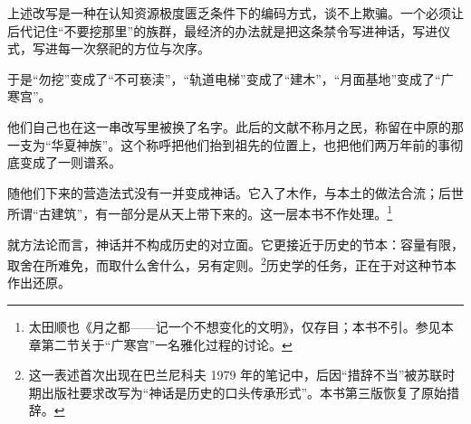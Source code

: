 上述改写是一种在认知资源极度匮乏条件下的编码方式，谈不上欺骗。一个必须让后代记住“不要挖那里”的族群，最经济的办法就是把这条禁令写进神话，写进仪式，写进每一次祭祀的方位与次序。

于是“勿挖”变成了“不可亵渎”，“轨道电梯”变成了“建木”，“月面基地”变成了“广寒宫”。

他们自己也在这一串改写里被换了名字。此后的文献不称月之民，称留在中原的那一支为“华夏神族”。这个称呼把他们抬到祖先的位置上，也把他们两万年前的事彻底变成了一则谱系。

随他们下来的营造法式没有一并变成神话。它入了木作，与本土的做法合流；后世所谓“古建筑”，有一部分是从天上带下来的。这一层本书不作处理。\footnote{太田顺也《月之都——记一个不想变化的文明》，仅存目；本书不引。参见本章第二节关于“广寒宫”一名雅化过程的讨论。}

就方法论而言，神话并不构成历史的对立面。它更接近于历史的节本：容量有限，取舍在所难免，而取什么舍什么，另有定则。\footnote{这一表述首次出现在巴兰尼科夫 1979 年的笔记中，后因“措辞不当”被苏联时期出版社要求改写为“神话是历史的口头传承形式”。本书第三版恢复了原始措辞。}历史学的任务，正在于对这种节本作出还原。
